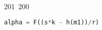 201~200~\documentclass{article}
\begin{document}
\begin{lstlisting}[language=Python, caption = Cracking private key Chall 3]
	                                                                        	                                                                    	                                	                    	                    	                        	                        	                    	                                                                	                	                                                                    	                    							                                                                                                                                                                                                    		                                                                                                                        				    			                                                alpha = F((s*k - h(m1))/r)
	                                                                        	                                                                    	                                	                    	                    	                        	                        	                    	                                                                	                	                                                                    	                    							                                                                                                                                                                                                    		                                                                                                                        				    			                                                    if alpha * G == A3:
	                                                                        	                                                                    	                                	                    	                    	                        	                        	                    	                                                                	                	                                                                    	                    							                                                                                                                                                                                                    		                                                                                                                        				    			                                                            print("Cracked private key")

\end{lstlisting}
\end{document}
